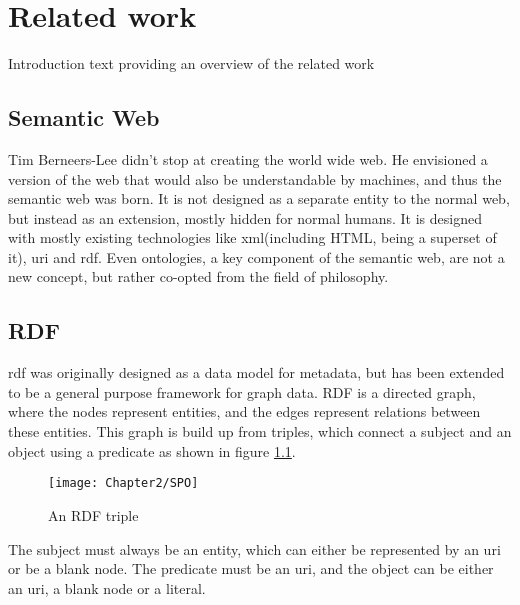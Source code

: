 
\chapter{Related work}
\label{chapter:related_work}

Introduction text providing an overview of the related work

\section{Semantic Web}
Tim Berneers-Lee didn't stop at creating the world wide web. He envisioned a version of the web that would also be understandable by machines, and thus the semantic web was born. It is not designed as a separate entity to the normal web, but instead as an extension, mostly hidden for normal humans. It is designed with mostly existing technologies like \acrshort{xml}(including HTML, being a superset of it), \acrfull{uri} and \acrfull{rdf}. Even ontologies, a key component of the semantic web, are not a new concept, but rather co-opted from the field of philosophy. \citep{thesemanticweb}

\section{RDF}
\acrfull{rdf} was originally designed as a data model for metadata, but has been extended to be a general purpose framework for graph data. RDF is a directed graph, where the nodes represent entities, and the edges represent relations between these entities. This graph is build up from triples, which connect a subject and an object using a predicate as shown in figure \ref{fig:rdf_triple}. 

\begin{figure}
    \centering
    \texttt{[image: Chapter2/SPO]}
    \caption{An RDF triple}
    \label{fig:rdf_triple}
\end{figure}

The subject must always be an entity, which can either be represented by an \acrshort{uri} or be a blank node. The predicate must be an \acrshort{uri}, and the object can be either an \acrshort{uri}, a blank node or a literal. \citep{rdfprimer}

